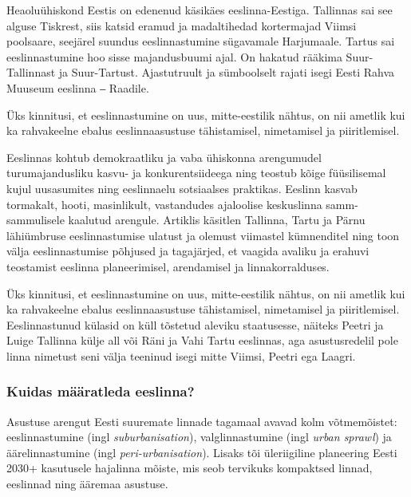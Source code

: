 \documentclass[estonian,]{article}
\begin{document}
Heaoluühiskond Eestis on edenenud käsikäes eeslinna-Eestiga. Tallinnas sai see alguse Tiskrest, siis katsid eramud ja madaltihedad kortermajad Viimsi poolsaare, seejärel suundus eeslinnastumine sügavamale Harjumaale. Tartus sai eeslinnastumine hoo sisse majandusbuumi ajal. On hakatud rääkima Suur-Tallinnast ja Suur-Tartust. Ajastutruult ja sümboolselt rajati isegi Eesti Rahva Muuseum eeslinna ‒ Raadile.

\begin{blockquote-left}
Üks kinnitusi, et eeslinnastumine on uus, mitte-eestilik nähtus, on nii
ametlik kui ka rahvakeelne ebalus eeslinnaasustuse tähistamisel,
nimetamisel ja piiritlemisel.
\end{blockquote-left}

Eeslinnas kohtub demokraatliku ja vaba ühiskonna arengumudel turumajandusliku kasvu- ja konkurentsiideega ning teostub kõige füüsilisemal kujul uusasumites ning eeslinnaelu sotsiaalses praktikas. Eeslinn kasvab tormakalt, hooti, masinlikult, vastandudes ajaloolise keskuslinna samm-sammulisele kaalutud arengule. Artiklis käsitlen Tallinna, Tartu ja Pärnu lähiümbruse eeslinnastumise ulatust ja olemust viimastel kümnenditel ning toon välja eeslinnastumise põhjused ja tagajärjed, et vaagida avaliku ja erahuvi teostamist eeslinna planeerimisel, arendamisel ja linnakorralduses.

Üks kinnitusi, et eeslinnastumine on uus, mitte-eestilik nähtus, on nii ametlik kui ka rahvakeelne ebalus eeslinnaasustuse tähistamisel, nimetamisel ja piiritlemisel. Eeslinnastunud külasid on küll tõstetud aleviku staatusesse, näiteks Peetri ja Luige Tallinna külje all või Räni ja Vahi Tartu eeslinnas, aga asustusredelil pole linna nimetust seni välja teeninud isegi mitte Viimsi, Peetri ega Laagri.

\hypertarget{kuidas-muxe4uxe4ratleda-eeslinna}{%
\subsubsection*{Kuidas määratleda eeslinna?}\label{kuidas-muxe4uxe4ratleda-eeslinna}}

Asustuse arengut Eesti suuremate linnade tagamaal avavad kolm võtmemõistet: eeslinnastumine (ingl \emph{suburbanisation}), valglinnastumine (ingl \emph{urban sprawl}) ja äärelinnastumine (ingl \emph{peri-urbanisation}). Lisaks tõi üleriigiline planeering Eesti 2030+ kasutusele hajalinna mõiste, mis seob tervikuks kompaktsed linnad, eeslinnad ning ääremaa asustuse.
\end{document}
